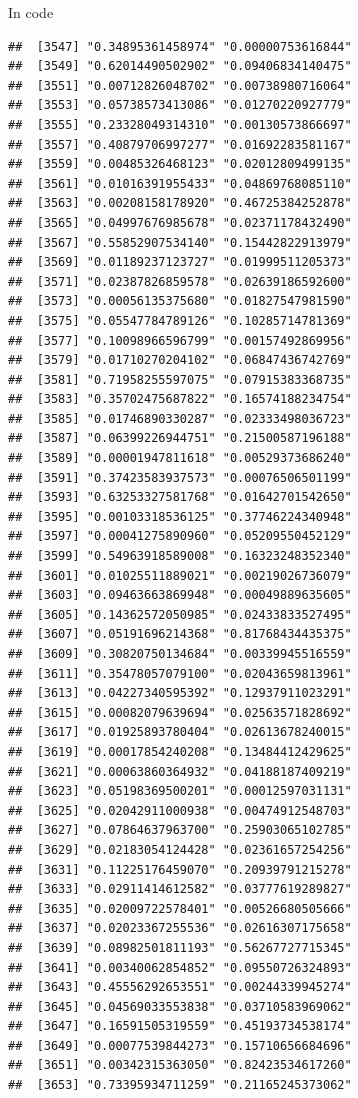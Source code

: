 \documentclass[ignorenonframetext,]{beamer}
\begin{document}
\begin{frame}[fragile]{In code}
\begin{verbatim}
##  [3547] "0.34895361458974" "0.00000753616844"
##  [3549] "0.62014490502902" "0.09406834140475"
##  [3551] "0.00712826048702" "0.00738980716064"
##  [3553] "0.05738573413086" "0.01270220927779"
##  [3555] "0.23328049314310" "0.00130573866697"
##  [3557] "0.40879706997277" "0.01692283581167"
##  [3559] "0.00485326468123" "0.02012809499135"
##  [3561] "0.01016391955433" "0.04869768085110"
##  [3563] "0.00208158178920" "0.46725384252878"
##  [3565] "0.04997676985678" "0.02371178432490"
##  [3567] "0.55852907534140" "0.15442822913979"
##  [3569] "0.01189237123727" "0.01999511205373"
##  [3571] "0.02387826859578" "0.02639186592600"
##  [3573] "0.00056135375680" "0.01827547981590"
##  [3575] "0.05547784789126" "0.10285714781369"
##  [3577] "0.10098966596799" "0.00157492869956"
##  [3579] "0.01710270204102" "0.06847436742769"
##  [3581] "0.71958255597075" "0.07915383368735"
##  [3583] "0.35702475687822" "0.16574188234754"
##  [3585] "0.01746890330287" "0.02333498036723"
##  [3587] "0.06399226944751" "0.21500587196188"
##  [3589] "0.00001947811618" "0.00529373686240"
##  [3591] "0.37423583937573" "0.00076506501199"
##  [3593] "0.63253327581768" "0.01642701542650"
##  [3595] "0.00103318536125" "0.37746224340948"
##  [3597] "0.00041275890960" "0.05209550452129"
##  [3599] "0.54963918589008" "0.16323248352340"
##  [3601] "0.01025511889021" "0.00219026736079"
##  [3603] "0.09463663869948" "0.00049889635605"
##  [3605] "0.14362572050985" "0.02433833527495"
##  [3607] "0.05191696214368" "0.81768434435375"
##  [3609] "0.30820750134684" "0.00339945516559"
##  [3611] "0.35478057079100" "0.02043659813961"
##  [3613] "0.04227340595392" "0.12937911023291"
##  [3615] "0.00082079639694" "0.02563571828692"
##  [3617] "0.01925893780404" "0.02613678240015"
##  [3619] "0.00017854240208" "0.13484412429625"
##  [3621] "0.00063860364932" "0.04188187409219"
##  [3623] "0.05198369500201" "0.00012597031131"
##  [3625] "0.02042911000938" "0.00474912548703"
##  [3627] "0.07864637963700" "0.25903065102785"
##  [3629] "0.02183054124428" "0.02361657254256"
##  [3631] "0.11225176459070" "0.20939791215278"
##  [3633] "0.02911414612582" "0.03777619289827"
##  [3635] "0.02009722578401" "0.00526680505666"
##  [3637] "0.02023367255536" "0.02616307175658"
##  [3639] "0.08982501811193" "0.56267727715345"
##  [3641] "0.00340062854852" "0.09550726324893"
##  [3643] "0.45556292653551" "0.00244339945274"
##  [3645] "0.04569033553838" "0.03710583969062"
##  [3647] "0.16591505319559" "0.45193734538174"
##  [3649] "0.00077539844273" "0.15710656684696"
##  [3651] "0.00342315363050" "0.82423534617260"
##  [3653] "0.73395934711259" "0.21165245373062"

\end{verbatim}
\end{frame}
\end{document}
